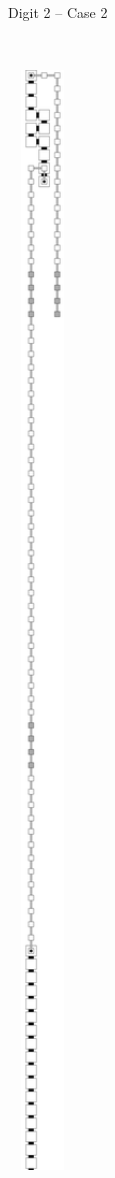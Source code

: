 \begin{itemize}
\begin{figure}[H]
\begin{subfigure}[t]{0.2\textwidth}
            \caption{\label{fig:digit_top_case2_digit2_msr} Digit 2 -- Case 2}
        \end{subfigure}%
        ~
        \begin{subfigure}[t]{0.2\textwidth}
            \centering
            \includegraphics[width=0.2\textwidth]{digit_tops/digit_top_case1_digit1_msr}

\end{subfigure}
\end{figure}
\end{itemize}
